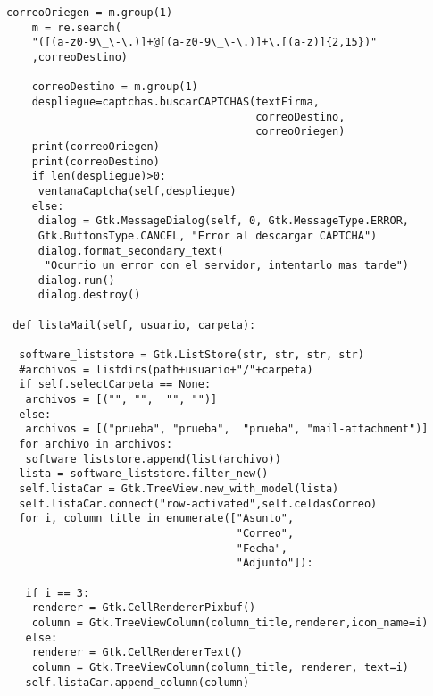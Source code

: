 \begin{lstlisting}[frame=single]
    correoOriegen = m.group(1)
    m = re.search(
    "([(a-z0-9\_\-\.)]+@[(a-z0-9\_\-\.)]+\.[(a-z)]{2,15})"
    ,correoDestino)
    
    correoDestino = m.group(1)
    despliegue=captchas.buscarCAPTCHAS(textFirma,
                                       correoDestino,
                                       correoOriegen)
    print(correoOriegen)
    print(correoDestino)
    if len(despliegue)>0:
     ventanaCaptcha(self,despliegue)
    else:
     dialog = Gtk.MessageDialog(self, 0, Gtk.MessageType.ERROR,
     Gtk.ButtonsType.CANCEL, "Error al descargar CAPTCHA")
     dialog.format_secondary_text(
      "Ocurrio un error con el servidor, intentarlo mas tarde")
     dialog.run()
     dialog.destroy()

 def listaMail(self, usuario, carpeta):
  
  software_liststore = Gtk.ListStore(str, str, str, str)
  #archivos = listdirs(path+usuario+"/"+carpeta)
  if self.selectCarpeta == None:
   archivos = [("", "",  "", "")]
  else:
   archivos = [("prueba", "prueba",  "prueba", "mail-attachment")]
  for archivo in archivos:
   software_liststore.append(list(archivo))
  lista = software_liststore.filter_new()
  self.listaCar = Gtk.TreeView.new_with_model(lista)
  self.listaCar.connect("row-activated",self.celdasCorreo)
  for i, column_title in enumerate(["Asunto", 
                                    "Correo", 
                                    "Fecha", 
                                    "Adjunto"]):                   

   if i == 3:
    renderer = Gtk.CellRendererPixbuf()
    column = Gtk.TreeViewColumn(column_title,renderer,icon_name=i)
   else:
    renderer = Gtk.CellRendererText()
    column = Gtk.TreeViewColumn(column_title, renderer, text=i)
   self.listaCar.append_column(column)
\end{lstlisting}
